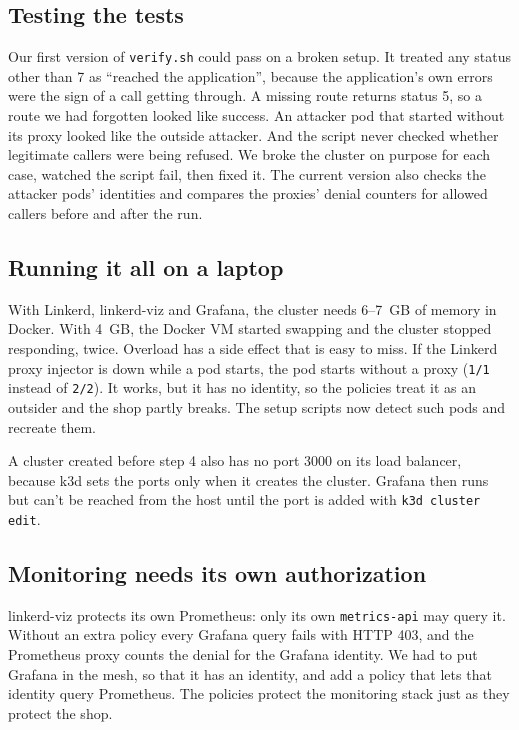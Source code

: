 \documentclass[12pt,a4paper]{article}
\begin{document}
\subsection*{Testing the tests}

Our first version of \texttt{verify.sh} could pass on a broken setup. It
treated any status other than 7 as ``reached the application'', because the
application's own errors were the sign of a call getting through. A missing
route returns status 5, so a route we had forgotten looked like success. An
attacker pod that started without its proxy looked like the outside
attacker. And the script never checked whether legitimate callers were being
refused. We broke the cluster on purpose for each case, watched the script
fail, then fixed it. The current version also checks the attacker pods'
identities and compares the proxies' denial counters for allowed callers
before and after the run.

\subsection*{Running it all on a laptop}

With Linkerd, linkerd-viz and Grafana, the cluster needs 6--7~GB of memory in
Docker. With 4~GB, the Docker VM started swapping and the cluster stopped
responding, twice. Overload has a side effect that is easy to miss. If the
Linkerd proxy injector is down while a pod starts, the pod starts without a
proxy (\texttt{1/1} instead of \texttt{2/2}). It works, but it has no
identity, so the policies treat it as an outsider and the shop partly breaks.
The setup scripts now detect such pods and recreate them.

A cluster created before step 4 also has no port 3000 on its load balancer,
because k3d sets the ports only when it creates the cluster. Grafana then runs
but can't be reached from the host until the port is added with
\texttt{k3d cluster edit}.

\subsection*{Monitoring needs its own authorization}

linkerd-viz protects its own Prometheus: only its own \texttt{metrics-api}
may query it. Without an extra policy every Grafana query fails with HTTP 403,
and the Prometheus proxy counts the denial for the Grafana identity. We had to put Grafana in the
mesh, so that it has an identity, and add a policy that lets that identity
query Prometheus. The policies protect the monitoring stack just as they
protect the shop.
\end{document}
